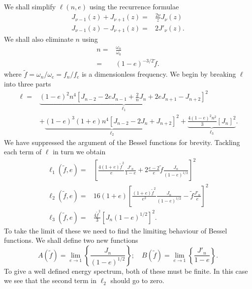 \documentclass[a4paper, 11pt, titlepage, twoside]{report}
\newcommand{\sub}[1]{\ensuremath{_\mathrm{#1}}}
\begin{document}
We shall simplify $\ell(n,e)$ using the recurrence formulae\cite{Watson1995}
\begin{align}
J_{\nu-1}(z) + J_{\nu+1}(z) = {} & \frac{2\nu}{z}J_\nu(z)\\
J_{\nu-1}(z) - J_{\nu+1}(z) = {} & 2J'_\nu(z).
\end{align}
We shall also eliminate $n$ using
\begin{align}
n = {} & \frac{\omega_n}{\omega_0} \nonumber \\
= {} & (1-e)^{-3/2}\widetilde{f}.
\end{align}
where $\widetilde{f} = \omega_n/\omega\sub{c} = f_n/f\sub{c}$ is a dimensionless frequency. We begin by breaking $\ell$ into three parts
\begin{align}
\ell = {} & \underbrace{(1-e)^2n^4\left[J_{n-2} - 2eJ_{n-1} + \frac{2}{n}J_n + 2eJ_{n+1} - J_{n+2}\right]^2}_{\ell_1} \nonumber \\
  & + \underbrace{(1-e)^3(1+e)n^4\left[J_{n-2} - 2J_n + J_{n+2}\right]^2}_{\ell_2} + \underbrace{\frac{4(1-e)^2n^2}{3}\left[J_n\right]^2}_{\ell_3}.
\end{align}
We have suppressed the argument of the Bessel functions for brevity. Tackling each term of $\ell$ in turn we obtain
\begin{align}
\ell_1(\widetilde{f},e) = {} & \left[\frac{4(1+e)\widetilde{f}^2}{e}\frac{J'_n}{1-e} + 2\frac{e-2}{e}\widetilde{f}\frac{J_n}{(1-e)^{1/2}}\right]^2\\
\ell_2(\widetilde{f},e) = {} & 16(1+e)\left[\frac{(1+e)\widetilde{f}^2}{e^2}\frac{J_n}{(1-e)^{1/2}} - \widetilde{f}\frac{J'_n}{e}\right]^2\\
\ell_3(\widetilde{f},e) = {} & \frac{4\widetilde{f}^2}{3}\left[{J_n}{(1-e)^{1/2}}\right]^2.
\end{align}
To take the limit of these we need to find the limiting behaviour of Bessel functions. We shall define two new functions
\begin{equation}
A(\widetilde{f}) = \lim_{e\rightarrow 1}\left\{\frac{J_n}{(1-e)^{1/2}}\right\}; \quad B(\widetilde{f}) = \lim_{e\rightarrow 1}\left\{\frac{J'_n}{1-e}\right\}.
\end{equation}
To give a well defined energy spectrum, both of these must be finite. In this case we see that the second term in $\ell_2$ should go to zero.
\end{document}
